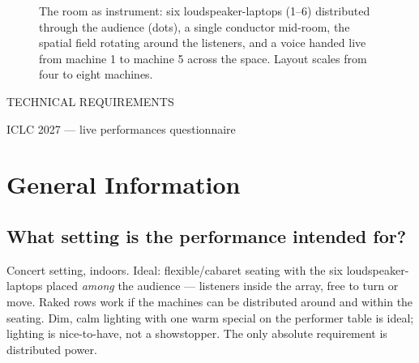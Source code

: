 \documentclass[10pt,letterpaper]{article}
\begin{document}
\vspace{10pt}
\begin{figure}[h]
\centering
{}
\caption{The room as instrument: six loudspeaker-laptops (1--6) distributed
through the audience (dots), a single conductor mid-room, the spatial field
rotating around the listeners, and a voice handed live from machine 1 to
machine 5 across the space. Layout scales from four to eight machines.}
\label{fig:room}
\end{figure}

\newpage

\begin{center}
{\acbold\fontsize{22pt}{26pt}\selectfont TECHNICAL REQUIREMENTS\par}
\vspace{2pt}
{\small\color{fog}ICLC 2027 --- live performances questionnaire\par}
\end{center}

\section{General Information}

\subsection{What setting is the performance intended for?}
Concert setting, indoors. Ideal: flexible/cabaret seating with the six
loudspeaker-laptops placed \emph{among} the audience --- listeners inside
the array, free to turn or move. Raked rows work if the machines can be
distributed around and within the seating. Dim, calm lighting with one warm
special on the performer table is ideal; lighting is nice-to-have, not a
showstopper. The only absolute requirement is distributed power.
\end{document}
